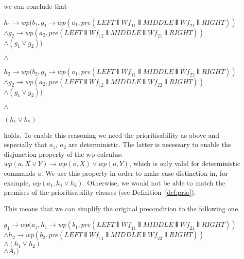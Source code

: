 \documentclass[11pt]{article}
\newcommand{\Wf}{\mathit{Wf}}
\begin{document}
\noindent
we can conclude that 

\noindent
$h_1 \longrightarrow wp(b_1,g_1 \longrightarrow wp(a_1,pre(LEFT \interleave \Wf_{11} \interleave MIDDLE \interleave \Wf_{21} \interleave RIGHT))$ \\
\hspace*{60pt}        $\land g_2 \longrightarrow wp(a_2,pre(LEFT \interleave \Wf_{12} \interleave MIDDLE \interleave \Wf_{21} \interleave RIGHT))$ \\
\hspace*{60pt}        $\land (g_1 \lor g_2))$ 

\noindent
$\land$

\noindent
$h_2 \longrightarrow wp(b_2,g_1 \longrightarrow wp(a_1,pre(LEFT \interleave \Wf_{11} \interleave MIDDLE \interleave \Wf_{22} \interleave RIGHT))$ \\
\hspace*{60pt} $\land g_2 \longrightarrow wp(a_2,pre(LEFT \interleave \Wf_{12} \interleave MIDDLE \interleave \Wf_{22} \interleave RIGHT))$ \\ 
\hspace*{60pt} $\land (g_1 \lor g_2))$

\noindent
$\land$

\noindent
$(h_1 \lor h_2)$

\noindent
holds. To enable this reasoning we need the prioritisability as above and especially that $a_1$, $a_2$ are deterministic. The latter is necessary to enable the disjunction property of the wp-calculus: $wp(a,X \lor Y) \longrightarrow wp(a,X) \lor wp(a,Y)$, which is only valid for deterministic commands $a$. We use this property in order to make case distinction in, for example, $wp(a_1,h_1 \lor h_2)$. Otherwise, we would not be able to match the premises of the prioritisability clauses (see Definition~\ref{def:prio}).

\noindent
This means that we can simplify the original precondition to the following one.

\noindent
$g_1 \longrightarrow wp(a_1,h_1 \longrightarrow wp(b_1,pre(LEFT \interleave \Wf_{11} \interleave MIDDLE \interleave \Wf_{21} \interleave RIGHT))$ \\
\hspace*{60pt}          $\land h_2 \longrightarrow wp(b_2,pre(LEFT \interleave \Wf_{11} \interleave MIDDLE \interleave \Wf_{22} \interleave RIGHT))$ \\
\hspace*{60pt}          $\land (h_1 \lor h_2)$ \\
\hspace*{60pt} $\land A_1)$ 
\end{document}
